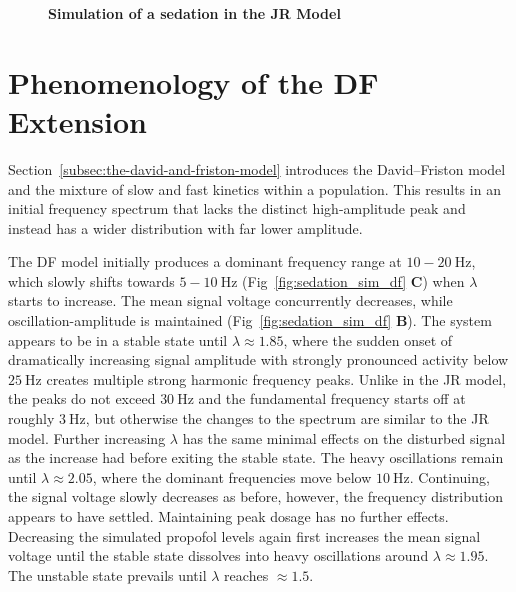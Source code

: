 \begin{figure}[H]

\caption{\textbf{Simulation of a sedation in the JR Model}
}\label{fig:sedation_sim_jr}
\end{figure}

\toggletrue{drawLocRoc}
\def\simRunName{DF_SEDATION_150}
\def\simRunTime{151}
\def\locStart{1.85}
\def\locST{33.5} %
\def\locEnd{2.05}
\def\locET{39.75}%
\def\rocStart{1.95}
\def\rocST{114.72}%
\def\rocEnd{1.5}
\def\rocET{128.81}%
\section{Phenomenology of the DF Extension}\label{subsec:phenomenology-of-the-df-extension}
Section~\ref{subsec:the-david-and-friston-model} introduces the David--Friston model and
    the mixture of slow and fast kinetics within a population.
    This results in an initial frequency spectrum
    that lacks the distinct high-amplitude peak and instead has a wider distribution with far lower amplitude.

    The DF model initially produces a dominant frequency range at $10-20 \SI{}{\hertz} $,
    which slowly shifts towards $ 5-10 \SI{}{\hertz} $ (Fig~\ref{fig:sedation_sim_df} \textbf{C}) when $\lambda$ starts to increase.
    The mean signal voltage concurrently decreases,
    while oscillation-amplitude is maintained (Fig~\ref{fig:sedation_sim_df} \textbf{B}).
    The system appears to be in a stable state until $ \lambda \approx \locStart $,
    where the sudden onset of dramatically
    increasing signal amplitude with strongly pronounced activity below $ \SI{25}{\hertz} $
    creates multiple strong harmonic frequency peaks.
    Unlike in the JR model, the peaks do not exceed  $ \SI{30}{\hertz} $ and the fundamental frequency starts off
    at roughly $\SI{3}{\hertz}$,
    but otherwise the changes to the spectrum are similar to the JR model.
    Further increasing $\lambda$ has the same minimal effects on the disturbed signal
    as the increase had before exiting the stable state.
    The heavy oscillations remain until $\lambda \approx \locEnd $,
    where the dominant frequencies move below $\SI{10}{\hertz}$.
    Continuing, the signal voltage slowly decreases as before,
    however, the frequency distribution appears to have settled.
    Maintaining peak dosage has no further effects.
    Decreasing the simulated propofol levels again first increases the mean signal voltage
    until the stable state dissolves into heavy oscillations around $\lambda \approx \rocStart$.
    The unstable state prevails until $\lambda$ reaches $\approx \rocEnd$.


